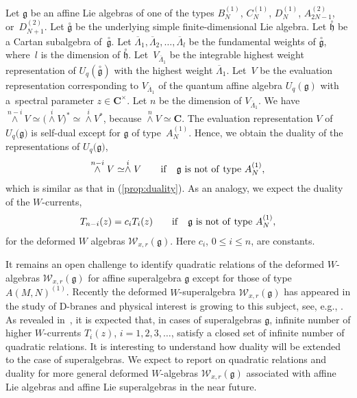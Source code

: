 \documentclass[10pt,a4paper]{amsart}
\numberwithin{equation}{section}
\begin{document}
Let ${\mathfrak g}$ be an affine Lie algebras of one of the types
$B_N^{(1)}$, $C_N^{(1)}$, $D_N^{(1)}$, $A_{2N-1}^{(2)}$, or~$D_{N+1}^{(2)}$.
Let $\stackrel{\circ}{\mathfrak g}$ be
the underlying simple finite-dimensional Lie algebra.
Let $\stackrel{\circ}{\mathfrak h}$ be a Cartan subalgebra of~$\stackrel{\circ}{\mathfrak g}$.
Let $\overline{\Lambda}_1, \overline{\Lambda}_2, \dots, \overline{\Lambda}_l$
be the fundamental weights of $\stackrel{\circ}{\mathfrak g}$, where~$l$ is the dimension of $\stackrel{\circ}{\mathfrak h}$.
Let~$V_{\overline{\Lambda}_1}$ be the integrable highest weight representation of
$U_q(\stackrel{\circ}{\mathfrak g})$ with the highest weight $\overline{\Lambda}_1$.
Let~$V$ be the evaluation representation corresponding to $V_{\overline{\Lambda}_1}$
of the quantum affine algebra $U_q({\mathfrak g})$
with a~spectral parameter $z \in {\mathbf C}^\times$.
Let $n$ be the dimension of $V_{\overline{\Lambda}_1}$.
We have $\stackrel{n-i}{\wedge} V \simeq\bigl(\stackrel{i}{\wedge} V \bigr)^* \simeq
\stackrel{i}{\wedge} V^*$, because $\stackrel{n}{\wedge} V \simeq {\mathbf C}$.
The evaluation representation $V$ of $U_q\big({\mathfrak g}\big)$ is self-dual except for
${\mathfrak g}$ of type~$A_N^{(1)}$. Hence, we obtain the duality of the representations of
$U_q\bigl({\mathfrak g}\bigr)$,
\begin{gather*}
\stackrel{n-i}{\wedge} V \simeq
\stackrel{i}{\wedge} V\qquad {\rm if}\quad {\mathfrak g}~{\rm is~not~of~type}~A_N^{(1)},
\end{gather*}
which is similar as {that} in (\ref{prop:duality}).
As an analogy, we expect the duality of the $W$-currents,
\begin{gather*}
T_{n-i}(z)=c_i T_i(z)\qquad {\rm if}\quad
{\mathfrak g}~{\rm is~not~of~type}~A_N^{(1)},
\end{gather*}
for the deformed $W$ algebras ${\mathcal W}_{x,r}({\mathfrak g})$.
Here $c_i$, $0 \leq i \leq n$, are constants.


It remains an open challenge
to identify quadratic relations of the deformed $W$-algebras
${\mathcal W}_{x,r}({\mathfrak g})$ for affine
superalgebra ${\mathfrak g}$
except for those of type $A(M,N)^{(1)}$.
Recently the deformed $W$-superalgebra
${\mathcal W}_{x,r}({\mathfrak g})$
has appeared in the study of D-branes and physical interest is growing to this subject, see, e.g.,
\cite{Harada-Matsuo-Noshita-Watanabe}.
As revealed in~\cite{Harada-Matsuo-Noshita-Watanabe, Kojima2, Kojima1},
it is expected that, in cases of superalgebras ${\mathfrak g}$,
infinite number of higher $W$-currents $T_i(z)$, $i=1,2,3,\dots$,
satisfy a closed set of infinite number of quadratic relations.
It is interesting to understand how duality will be extended to the case of superalgebras.
We expect to report on quadratic relations and duality
for more general deformed $W$-algebras
${\mathcal W}_{x,r}({\mathfrak g})$ associated with
affine Lie algebras and affine Lie superalgebras in the near future.
\end{document}
